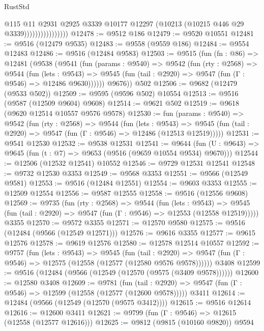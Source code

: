 \begin{lexlean}{RustStd}
\begin{coremodule}
                                @115
                                @11
                                @2931
                                @2925
                                @3339
                                @10177
                                @12297
                                (@10213 (@10215 @446 @29 @3339))))))))))))))))
@12478 := @9512 @186
@12479 := @9520 @10551
@12481 := @9516 (@12479 @9535)
@12483 := @9558 (@9559 @186)
@12484 := @9554 @12483
@12486 := @9516 (@12484 @9583)
@12503 := @9515
    (fun (fn : @86) =>
    @12481
      (@9538
        (@9541
          (fun (params : @9540) =>
          @9542
            (fun (rty : @2568) =>
            @9544
              (fun (lets : @9543) =>
              @9545 (fun (tail : @2920) => @9547 (fun (Γ : @9546) => @12486 @9630))))))
        @9676))
    @502
@12506 := @9682 (@12479 (@9533 @502))
@12509 := @9595 (@9596 @502) @10554
@12513 := @9516 (@9587 (@12509 @9604) @9608)
@12514 := @9621 @502
@12519 := @9618 (@9620 @12514 @10557 @9576 @9578)
@12530 := fun (params : @9540) =>
  @9542
    (fun (rty : @2568) =>
    @9544
      (fun (lets : @9543) =>
      @9545 (fun (tail : @2920) => @9547 (fun (Γ : @9546) => @12486 (@12513 @12519)))))
@12531 := @9541 @12530
@12532 := @9538 @12531
@12541 := @9644
    (fun (U : @9643) => @9645 (fun (t : @7) => @9653 (@9516 (@9659 @10554 @9534) @9670)))
@12544 := @12506 (@12532 @12541) @10552
@12546 := @9729 @12531 @12541
@12548 := @9732 @12530 @3353
@12549 := @9568 @3353
@12551 := @9566 (@12549 @9581)
@12553 := @9516 (@12484 @12551)
@12554 := @9603 @3353
@12555 := @12509 @12554
@12556 := @9587 @12555
@12558 := @9516 (@12556 @9608)
@12569 := @9735
    (fun (rty : @2568) =>
    @9544
      (fun (lets : @9543) =>
      @9545 (fun (tail : @2920) => @9547 (fun (Γ : @9546) => @12553 (@12558 @12519)))))
    @3355
@12570 := @9572 @3355
@12571 := @12570 @9580
@12575 := @9516 (@12484 (@9566 (@12549 @12571)))
@12576 := @9616 @3355
@12577 := @9615 @12576
@12578 := @9619 @12576
@12580 := @12578 @12514 @10557
@12592 := @9757
    (fun (lets : @9543) =>
    @9545
      (fun (tail : @2920) =>
      @9547 (fun (Γ : @9546) => @12575 (@12558 (@12577 (@12580 @9576 @9578))))))
    @3408
@12599 := @9516 (@12484 (@9566 (@12549 (@12570 (@9575 (@3409 @9578))))))
@12600 := @12580 @3408
@12609 := @9781
    (fun (tail : @2920) => @9547 (fun (Γ : @9546) => @12599 (@12558 (@12577 (@12600 @9578)))))
    @3411
@12614 := @12484 (@9566 (@12549 (@12570 (@9575 @3412))))
@12615 := @9516 @12614
@12616 := @12600 @3411
@12621 := @9799 (fun (Γ : @9546) => @12615 (@12558 (@12577 @12616)))
@12625 := @9812 (@9815 (@10160 @9820)) @9594

\end{coremodule}
\end{lexlean}
